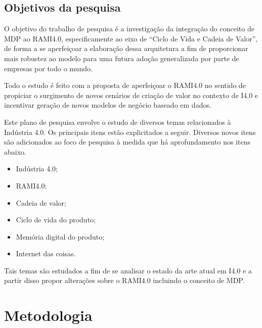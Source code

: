 \documentclass[
	12pt,				%
	oneside,			%
	a4paper,			%
	english,			%
	brazil				%
]{abntex2}
\begin{document}
\section{Objetivos da pesquisa}

	O objetivo do trabalho de pesquisa é a investigação da integração do conceito de MDP ao RAMI4.0, especificamente ao eixo de ``Ciclo de Vida e Cadeia de Valor'', de forma a se aperfeiçoar a elaboração dessa arquitetura a fim de proporcionar mais robustez ao modelo para uma futura adoção generalizada por parte de empresas por todo o mundo.
	
	Todo o estudo é feito com a proposta de aperfeiçoar o RAMI4.0 no sentido de propiciar o surgimento de novos cenários de criação de valor no contexto de I4.0 e incentivar geração de novos modelos de negócio baseado em dados.
	
	Este plano de pesquisa envolve o estudo de diversos temas relacionados à Indústria 4.0. Os principais itens estão explicitados a seguir. Diversos novos itens são adicionados ao foco de pesquisa à medida que há aprofundamento nos itens abaixo.
	
	\begin{itemize}
		\item Indústria 4.0;
		\item RAMI4.0;
		\item Cadeia de valor;
		\item Ciclo de vida do produto;
		\item Memória digital do produto;
		\item Internet das coisas.
	\end{itemize}
	
	Tais temas são estudados a fim de se analisar o estado da arte atual em I4.0 e a partir disso propor alterações sobre o RAMI4.0 incluindo o conceito de MDP.





























\chapter{Metodologia}
\end{document}
